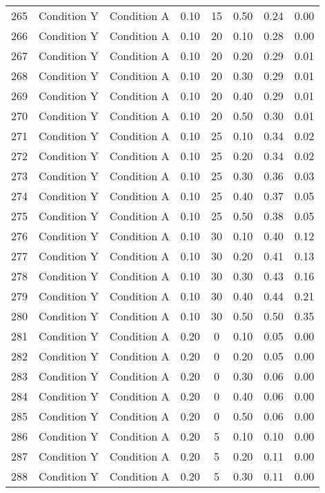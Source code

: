 \begin{landscape}
\begin{longtable}{cc cc cc cc}
  265 & Condition Y & Condition A & 0.10 &  15 & 0.50 & 0.24 & 0.00 \\ 
  266 & Condition Y & Condition A & 0.10 &  20 & 0.10 & 0.28 & 0.00 \\ 
  267 & Condition Y & Condition A & 0.10 &  20 & 0.20 & 0.29 & 0.01 \\ 
  268 & Condition Y & Condition A & 0.10 &  20 & 0.30 & 0.29 & 0.01 \\ 
  269 & Condition Y & Condition A & 0.10 &  20 & 0.40 & 0.29 & 0.01 \\ 
  270 & Condition Y & Condition A & 0.10 &  20 & 0.50 & 0.30 & 0.01 \\ 
  271 & Condition Y & Condition A & 0.10 &  25 & 0.10 & 0.34 & 0.02 \\ 
  272 & Condition Y & Condition A & 0.10 &  25 & 0.20 & 0.34 & 0.02 \\ 
  273 & Condition Y & Condition A & 0.10 &  25 & 0.30 & 0.36 & 0.03 \\ 
  274 & Condition Y & Condition A & 0.10 &  25 & 0.40 & 0.37 & 0.05 \\ 
  275 & Condition Y & Condition A & 0.10 &  25 & 0.50 & 0.38 & 0.05 \\ 
  276 & Condition Y & Condition A & 0.10 &  30 & 0.10 & 0.40 & 0.12 \\ 
  277 & Condition Y & Condition A & 0.10 &  30 & 0.20 & 0.41 & 0.13 \\ 
  278 & Condition Y & Condition A & 0.10 &  30 & 0.30 & 0.43 & 0.16 \\ 
  279 & Condition Y & Condition A & 0.10 &  30 & 0.40 & 0.44 & 0.21 \\ 
  280 & Condition Y & Condition A & 0.10 &  30 & 0.50 & 0.50 & 0.35 \\ 
  281 & Condition Y & Condition A & 0.20 &   0 & 0.10 & 0.05 & 0.00 \\ 
  282 & Condition Y & Condition A & 0.20 &   0 & 0.20 & 0.05 & 0.00 \\ 
  283 & Condition Y & Condition A & 0.20 &   0 & 0.30 & 0.06 & 0.00 \\ 
  284 & Condition Y & Condition A & 0.20 &   0 & 0.40 & 0.06 & 0.00 \\ 
  285 & Condition Y & Condition A & 0.20 &   0 & 0.50 & 0.06 & 0.00 \\ 
  286 & Condition Y & Condition A & 0.20 &   5 & 0.10 & 0.10 & 0.00 \\ 
  287 & Condition Y & Condition A & 0.20 &   5 & 0.20 & 0.11 & 0.00 \\ 
  288 & Condition Y & Condition A & 0.20 &   5 & 0.30 & 0.11 & 0.00 \\ 

\end{longtable}
\end{landscape}
